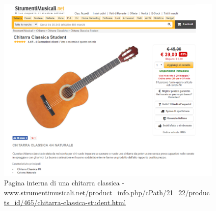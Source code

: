\documentclass[12pt]{article}
\begin{document}
	 \begin{figure}
	 	\centering	
	 	\includegraphics[width=180mm]{images/paginaProdotto.png}
	 	\caption{Pagina interna di una chitarra classica - \url{www.strumentimusicali.net/product_info.php/cPath/21_22/products_id/465/chitarra-classica-student.html}} 
	 \end{figure}
 	\newpage
\end{document}
